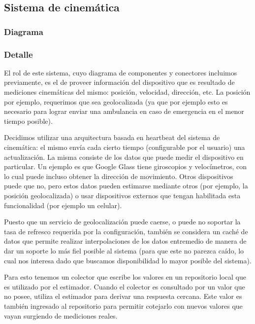 \subsection{Sistema de cinemática}
\subsubsection{Diagrama}


\subsubsection{Detalle}

El rol de este sistema, cuyo diagrama de componentes y conectores
incluimos previamente, es el de proveer información del dispositivo
que es resultado de mediciones cinemáticas del mismo: posición,
velocidad, dirección, etc. La posición por ejemplo, requerimos que sea
geolocalizada (ya que por ejemplo esto es necesario para lograr enviar
una ambulancia en caso de emergencia en el menor tiempo posible).

Decidimos utilizar una arquitectura basada en heartbeat del sistema
de cinemática: el mismo envía cada cierto tiempo (configurable por
el usuario) una actualización. La misma consiste de los datos que
puede medir el dispositivo en particular. Un ejemplo es que Google
Glass tiene giroscopios y velocímetros, con lo cual puede incluso
obtener la dirección de movimiento. Otros dispositivos puede que no,
pero estos datos pueden estimarse mediante otros (por ejemplo, la
posición geolocalizada) o usar dispositivos externos que tengan
habilitada esta funcionalidad (por ejemplo un celular).

Puesto que un servicio de geolocalización puede caerse, o puede no
soportar la tasa de refresco requerida por la configuración, también
se considera un caché de datos que permite realizar interpolaciones
de los datos entremedio de manera de dar un soporte lo más fiel 
posible al sistema (para que este no parezca caído, lo cual nos 
interesa dado que buscamos disponibilidad lo mayor posible del 
sistema).

Para esto tenemos un colector que escribe los valores en un 
repositorio local que es utilizado por el estimador. Cuando el 
colector es consultado por un valor que no posee, utiliza el estimador
para derivar una respuesta cercana. Este valor es también ingresado
al repositorio para permitir cotejarlo con nuevos valores que vayan
surgiendo de mediciones reales.
